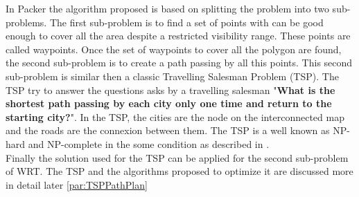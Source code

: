 In Packer \citep{53*packer2008}  the algorithm proposed is based on splitting the problem into two sub-problems. The first sub-problem is to find a set of points with can be good enough to cover all the area despite a restricted visibility range. These points are called waypoints.  
Once the set of waypoints to cover all the polygon are found, the second sub-problem is to create a path passing by all this points. 
 This second sub-problem is similar then a classic Travelling Salesman Problem (TSP). The TSP try to answer the questions asks by a travelling salesman "\textbf{What is the shortest path passing by each city only one time and return to the starting city?}".
  In the TSP, the cities are the node on the interconnected map and the roads are the connexion between them. The TSP is a well known as NP-hard and NP-complete in the some condition as described in \citep{236*karp1972}. \\ 
Finally the solution used for the TSP can be applied for the second sub-problem of WRT.
 The TSP and the algorithms proposed to optimize it are discussed more in detail later \ref{par:TSPPathPlan}


